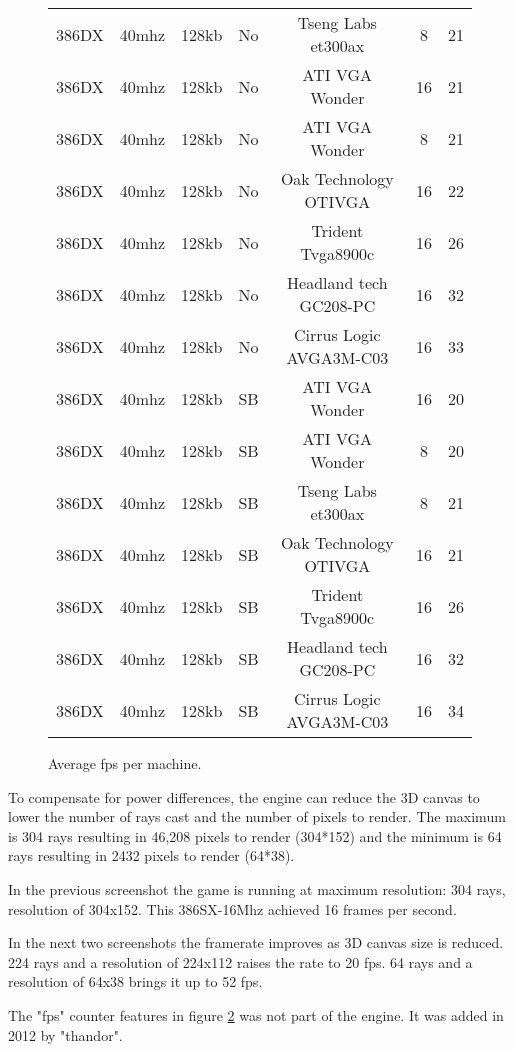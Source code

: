 \begin{figure}[H]
\begin{tabularx}{\textwidth}{ c  c c  c  c c c }
386DX &	40mhz	&128kb		& No & Tseng Labs et300ax	& 8	& 21 \\
386DX &	40mhz	&128kb		& No & ATI VGA Wonder	& 16	& 21 \\
386DX &	40mhz	&128kb		& No & ATI VGA Wonder	& 8	& 21 \\
386DX &	40mhz	&128kb		& No & Oak Technology OTIVGA  & 	16	&	22 \\
386DX &	40mhz	&128kb		& No &  Trident Tvga8900c	& 16	&	26 \\
386DX &	40mhz	&128kb		& No & Headland tech GC208-PC	& 16	&	32 \\
386DX &	40mhz	&128kb		& No & Cirrus Logic AVGA3M-C03	& 16	&	33 \\ \bottomrule

386DX &	40mhz	&128kb		& SB	& ATI VGA Wonder	& 16	& 20 \\
386DX &	40mhz	&128kb		& SB	& ATI VGA Wonder	& 8	& 20 \\
386DX &	40mhz	&128kb		& SB	& Tseng Labs et300ax	& 8	& 21 \\
386DX &	40mhz	&128kb		& SB	& Oak Technology OTIVGA  & 	16	&	21 \\
386DX &	40mhz	&128kb		& SB	&  Trident Tvga8900c	& 16	&	26 \\
386DX &	40mhz	&128kb		& SB	& Headland tech GC208-PC	& 16	&	32 \\
386DX &	40mhz	&128kb		& SB &	Cirrus Logic AVGA3M-C03	& 16	&	34 \\ \bottomrule
\end{tabularx}
\caption{Average fps per machine.}
\label{perf_summary}
\end{figure}



To compensate for power differences, the engine can reduce the 3D canvas to lower the number of rays cast and the number of pixels to render. The maximum is 304 rays resulting in 46,208 pixels to render (304*152) and the minimum is 64 rays resulting in 2432 pixels to render (64*38).\\
  \begin{figure}[H]
\centering
 \caption{}
 \label{fpscounter}
 \end{figure}
 \par
 In the previous screenshot the game is running at maximum resolution: 304 rays, resolution of 304x152. This 386SX-16Mhz achieved 16 frames per second.\\
 \par
 In the next two screenshots the framerate improves as 3D canvas size is reduced. 224 rays and a resolution of 224x112 raises the rate to 20 fps. 64 rays and a resolution of 64x38 brings it up to 52 fps.\\
 \par
  The "fps" counter features in figure \ref{fpscounter} was not part of the engine. It was added in 2012 by "thandor".

